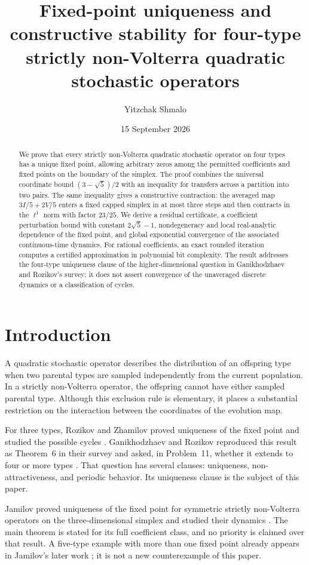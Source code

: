 \documentclass[11pt]{amsart}
\title[Four-type strictly non-Volterra operators]{Fixed-point uniqueness and constructive stability for four-type strictly non-Volterra quadratic stochastic operators}
\author{Yitzchak Shmalo}
\date{15 September 2026}
\theoremstyle{definition}
\begin{document}
\begin{abstract}
We prove that every strictly non-Volterra quadratic stochastic operator on four types has a unique fixed point, allowing arbitrary zeros among the permitted coefficients and fixed points on the boundary of the simplex. The proof combines the universal coordinate bound $(3-\sqrt5)/2$ with an inequality for transfers across a partition into two pairs. The same inequality gives a constructive contraction: the averaged map $3I/5+2V/5$ enters a fixed capped simplex in at most three steps and then contracts in the $\ell^1$ norm with factor $23/25$. We derive a residual certificate, a coefficient perturbation bound with constant $2\sqrt5-1$, nondegeneracy and local real-analytic dependence of the fixed point, and global exponential convergence of the associated continuous-time dynamics. For rational coefficients, an exact rounded iteration computes a certified approximation in polynomial bit complexity. The result addresses the four-type uniqueness clause of the higher-dimensional question in Ganikhodzhaev and Rozikov's survey; it does not assert convergence of the unaveraged discrete dynamics or a classification of cycles.
\end{abstract}
\maketitle

\section{Introduction}
A quadratic stochastic operator describes the distribution of an offspring type when two parental types are sampled independently from the current population. In a strictly non-Volterra operator, the offspring cannot have either sampled parental type. Although this exclusion rule is elementary, it places a substantial restriction on the interaction between the coordinates of the evolution map.

For three types, Rozikov and Zhamilov proved uniqueness of the fixed point and studied the possible cycles \cite{RZ09}. Ganikhodzhaev and Rozikov reproduced this result as Theorem~6 in their survey and asked, in Problem~11, whether it extends to four or more types \cite{GR09}. That question has several clauses: uniqueness, non-attractiveness, and periodic behavior. Its uniqueness clause is the subject of this paper.

Jamilov proved uniqueness of the fixed point for symmetric strictly non-Volterra operators on the three-dimensional simplex and studied their dynamics \cite{Jam16}. The main theorem is stated for its full coefficient class, and no priority is claimed over that result. A five-type example with more than one fixed point already appears in Jamilov's later work \cite{Jam17}; it is not a new counterexample of this paper.
\end{document}
